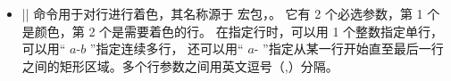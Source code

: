 \documentclass[dvipsnames]{article}%
\begin{document}
\begin{itemize}
\medskip
\begin{scope}
\hfuzz=10cm
\begin{BVerbatim}[baseline=c,boxwidth=9cm]
$\begin{pNiceMatrix}[r,margin] 
  \CodeBefore
    ~emphase#\chessboardcolors{red!15}{blue!15}@
  \Body
   1 & -1 &  1 \\
  -1 &  1 & -1 \\
   1 & -1 &  1
\end{pNiceMatrix}$
\end{BVerbatim}
$\begin{pNiceMatrix}[r,baseline=1, margin] 
\CodeBefore 
\chessboardcolors{red!15}{blue!15}
\Body
1 & -1 & 1 \\
-1 & 1 & -1 \\
1 & -1 & 1 
\end{pNiceMatrix}$
\end{scope}

 \medskip
从上例中可以看出，选项 |r| 使阵列中所有的列靠右对齐（参见p.~\pageref{key-R}）。

\bigskip
\item |\rowcolor| 命令用于对行进行着色，其名称源于  宏包，。
它有 2 个必选参数，第 1 个是颜色，第 2 个是需要着色的行。
在指定行时，可以用 1 个整数指定单行，可以用“ $a$-$b$ ”指定连续多行，
还可以用“ $a$- ”指定从某一行开始直至最后一行之间的矩形区域。多个行参数之间用英文逗号（,）分隔。


\end{itemize}
\end{document}
